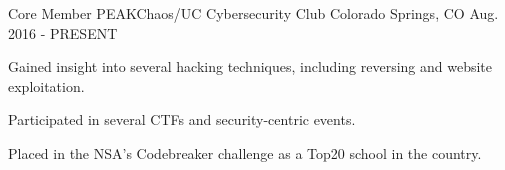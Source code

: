 

\begin{cventries}

  \cventry
    {Core Member} %
    {PEAKChaos/UC Cybersecurity Club} %
    {Colorado Springs, CO} %
    {Aug. 2016 - PRESENT} %
    {
      \begin{cvitems} %
        \item {Gained insight into several hacking techniques, including reversing and website exploitation. }
        \item {Participated in several CTFs and security-centric events. }
        \item {Placed in the NSA's Codebreaker challenge as a Top20 school in the country. }
      \end{cvitems}
    }

\end{cventries}

